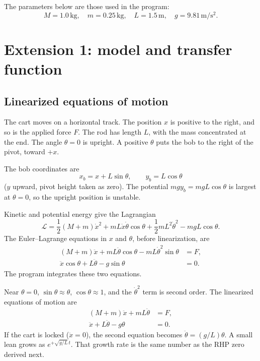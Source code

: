 \documentclass[12pt,a4paper]{article}
\begin{document}
The parameters below are those used in the program:
\[
  M=1.0\,\mathrm{kg},\quad
  m=0.25\,\mathrm{kg},\quad
  L=1.5\,\mathrm{m},\quad
  g=9.81\,\mathrm{m/s^2}.
\]

\section{Extension 1: model and transfer function}

\subsection{Linearized equations of motion}

The cart moves on a horizontal track. The position \(x\) is positive to the right, and so is the applied force \(F\).
The rod has length \(L\), with the mass concentrated at the end.
The angle \(\theta=0\) is upright. A positive \(\theta\) puts the bob to the right of the pivot, toward \(+x\).

The bob coordinates are
\[
  x_b=x+L\sin\theta,\qquad y_b=L\cos\theta
\]
(\(y\) upward, pivot height taken as zero).
The potential \(mgy_b=mgL\cos\theta\) is largest at \(\theta=0\), so the upright position is unstable.

Kinetic and potential energy give the Lagrangian
\[
  \mathcal{L}
  =\frac12(M+m)\dot x^2
   +mL\dot x\dot\theta\cos\theta
   +\frac12 mL^2\dot\theta^2
   -mgL\cos\theta.
\]
The Euler--Lagrange equations in \(x\) and \(\theta\), before linearization, are
\begin{align}
  (M+m)\ddot x+mL\ddot\theta\cos\theta-mL\dot\theta^2\sin\theta&=F,
  \label{eq:nl-x}\\
  \ddot x\cos\theta+L\ddot\theta-g\sin\theta&=0.
  \label{eq:nl-th}
\end{align}
The program integrates these two equations.

Near \(\theta=0\), \(\sin\theta\approx\theta\), \(\cos\theta\approx 1\), and the \(\dot\theta^2\) term is second order.
The linearized equations of motion are
\begin{align}
  (M+m)\ddot x+mL\ddot\theta&=F,
  \label{eq:lin-x}\\
  \ddot x+L\ddot\theta-g\theta&=0.
  \label{eq:lin-th}
\end{align}
If the cart is locked (\(\ddot x=0\)), the second equation becomes \(\ddot\theta=(g/L)\theta\).
A small lean grows as \(e^{+\sqrt{g/L}\,t}\).
That growth rate is the same number as the RHP zero derived next.
\end{document}

